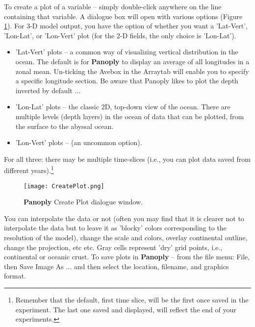 \documentclass[11pt,fleqn]{book} %
\begin{document}
To create a plot of a variable -- simply double-click anywhere on the line containing that variable. A dialogue box will open with various options (Figure \ref{fig:CreatePlot}). For 3-D model output, you have the option of whether you want a \footnotesize\textsf{'Lat-Vert'}\normalsize, \footnotesize\textsf{'Lon-Lat'}\normalsize, or \footnotesize\textsf{'Lon-Vert' }\normalsize plot (for the 2-D fields, the only choice is \footnotesize\textsf{'Lon-Lat'}\normalsize).
\begin{itemize}
\vspace{1mm}
\item \footnotesize\textsf{'Lat-Vert' }\normalsize plots -- a common way of visualizing vertical distribution in the ocean. The default is for \textbf{Panoply} to display an average of all longitudes in a zonal mean. Un-ticking the \footnotesize\textsf{Ave}\normalsize box in the \footnotesize\textsf{Array}\normalsize tab will enable you to specify a specific longitude section. Be aware that Panoply likes to plot the depth inverted by default ...
\vspace{1mm}
\item \footnotesize\textsf{'Lon-Lat' }\normalsize plots -- the classic 2D, top-down view of the ocean. There are multiple levels (depth layers) in the ocean of data that can be plotted, from the surface to the abyssal ocean.
\vspace{1mm}
\item \footnotesize\textsf{'Lon-Vert' }\normalsize plots -- (an uncommon option).
\end{itemize}
\vspace{2mm}
For all three: there may be multiple time-slices (i.e., you can plot data saved from different years).\footnote{Remember that the default, first time slice, will be the first once saved in the experiment. The last one saved and displayed, will reflect the end of your experiments.}

\begin{figure}[ht]
\begin{center}
\texttt{[image: CreatePlot.png]}
\end{center}
\caption{\textbf{Panoply} \textsf{Create Plot} dialogue window.}
\label{fig:CreatePlot}
\end{figure}

You can interpolate the data or not (often you may find that it is clearer not to interpolate the data but to leave it as 'blocky' colors corresponding to the resolution of the model), change the scale and colors, overlay continental outline, change the projection, etc etc. Gray cells represent 'dry' grid points, i.e., continental or oceanic crust.
To save plots in \textbf{Panoply} -- from the file menu: \footnotesize\textsf{File}\normalsize, then \footnotesize\textsf{Save Image As ... }\normalsize and then select the location, filename, and graphics format.
\end{document}
